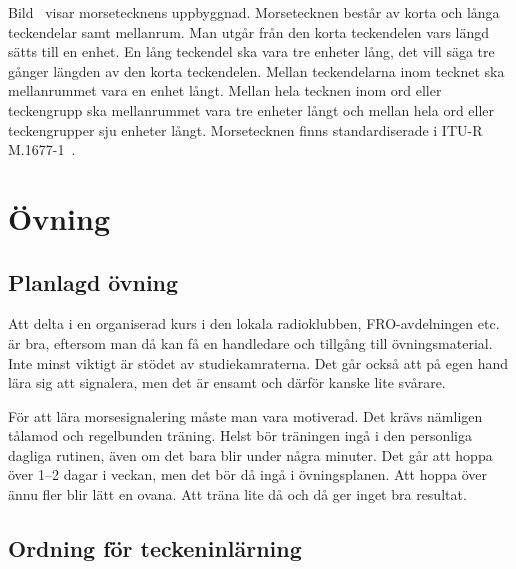 
Bild~ visar morsetecknens uppbyggnad.
Morsetecknen består av korta och långa teckendelar samt mellanrum.
Man utgår från den korta teckendelen vars längd sätts till en enhet.
En lång teckendel ska vara tre enheter lång, det vill säga tre gånger längden
av den korta teckendelen.
Mellan teckendelarna inom tecknet ska mellanrummet vara en enhet långt.
Mellan hela tecknen inom ord eller teckengrupp ska mellanrummet vara
tre enheter långt och mellan hela ord eller teckengrupper sju enheter långt.
Morsetecknen finns standardiserade i ITU-R M.1677-1~\cite{M1677-1}.

\section{Övning}

\subsection{Planlagd övning}

Att delta i en organiserad kurs i den lokala radioklubben, FRO-avdelningen etc.
är bra, eftersom man då kan få en handledare och tillgång till övningsmaterial.
Inte minst viktigt är stödet av studiekamraterna.
Det går också att på egen hand lära sig att signalera, men det är ensamt och
därför kanske lite svårare.

För att lära morsesignalering måste man vara motiverad.
Det krävs nämligen tålamod och regelbunden träning.
Helst bör träningen ingå i den personliga dagliga rutinen, även om det bara
blir under några minuter.
Det går att hoppa över 1--2 dagar i veckan, men det bör då ingå i övningsplanen.
Att hoppa över ännu fler blir lätt en ovana.
Att träna lite då och då ger inget bra resultat.

\subsection[Inlärningsordning]{Ordning för teckeninlärning}


